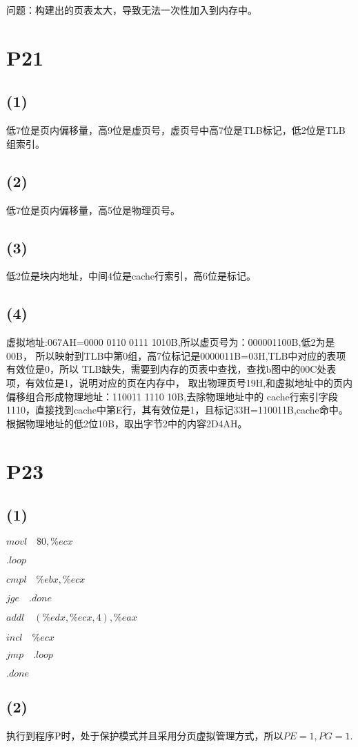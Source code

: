 \documentclass{article}
\begin{document}
问题：构建出的页表太大，导致无法一次性加入到内存中。
\section{P21}
\subsection*{(1)}
低7位是页内偏移量，高9位是虚页号，虚页号中高7位是TLB标记，低2位是TLB组索引。
\subsection*{(2)}
低7位是页内偏移量，高5位是物理页号。
\subsection*{(3)}
低2位是块内地址，中间4位是cache行索引，高6位是标记。
\subsection*{(4)}
虚拟地址:067AH=0000 0110 0111 1010B,所以虚页号为：000001100B,低2为是00B，
所以映射到TLB中第0组，高7位标记是0000011B=03H,TLB中对应的表项有效位是0，所以
TLB缺失，需要到内存的页表中查找，查找b图中的00C处表项，有效位是1，说明对应的页在内存中，
取出物理页号19H,和虚拟地址中的页内偏移组合形成物理地址：110011 1110 10B,去除物理地址中的
cache行索引字段1110，直接找到cache中第E行，其有效位是1，且标记33H=110011B,cache命中。
根据物理地址的低2位10B，取出字节2中的内容2D4AH。
\section{P23}
\subsection*{(1)}
$movl \quad \$0,\%ecx$

$.loop$

$cmpl \quad \%ebx,\%ecx$

$jge \quad .done$

$addl \quad (\%edx,\%ecx,4), \%eax$

$incl \quad \%ecx$

$jmp \quad .loop$

$.done$
\subsection*{(2)}
执行到程序P时，处于保护模式并且采用分页虚拟管理方式，所以$PE=1, PG=1$.
\end{document}
